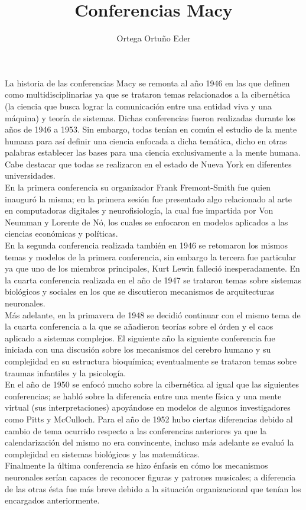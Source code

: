 \documentclass{article}
\title{Conferencias Macy}
\author{Ortega Ortu\~no Eder}
\date{} %
\begin{document}
	\maketitle
	\normalsize{
La historia de las conferencias Macy se remonta al año 1946 en las que definen como multidisciplinarias ya que se trataron temas relacionados a la cibernética (la ciencia que busca lograr la comunicación entre una entidad viva y una máquina) y teoría de sistemas. Dichas conferencias fueron realizadas durante los años de 1946 a 1953. Sin embargo, todas tenían en común el estudio de la mente humana para así definir una ciencia enfocada a dicha temática, dicho en otras palabras establecer las bases para una ciencia exclusivamente a la mente humana. Cabe destacar que todas se realizaron en el estado de Nueva York en diferentes universidades.
\\

En la primera conferencia su organizador Frank Fremont-Smith fue quien inauguró la misma; en la primera sesión fue presentado algo relacionado al arte en computadoras digitales y neurofisiología, la cual fue impartida por Von Neumman y Lorente de Nó, los cuales se enfocaron en modelos aplicados a las ciencias económicas y políticas.
\\

En la segunda conferencia realizada también en 1946 se retomaron los mismos temas y modelos de la primera conferencia, sin embargo la tercera fue particular ya que uno de los miembros principales, Kurt Lewin falleció inesperadamente. En la cuarta conferencia realizada en el año de 1947 se trataron temas sobre sistemas biológicos y sociales en los que se discutieron mecanismos de arquitecturas neuronales.
\\

Más adelante, en la primavera de 1948 se decidió continuar con el mismo tema de la cuarta conferencia a la que se añadieron teorías sobre el órden y el caos aplicado a sistemas complejos. El siguiente año la siguiente conferencia fue iniciada con una discusión sobre los mecanismos del cerebro humano y su complejidad en su estructura bioquímica; eventualmente se trataron temas sobre traumas infantiles y la psicología.
\\

En el año de 1950 se enfocó mucho sobre la cibernética al igual que las siguientes conferencias; se habló sobre la diferencia entre una mente física y una mente virtual (sus interpretaciones) apoyándose en modelos de algunos investigadores como Pitts y McCulloch. Para el año de 1952 hubo ciertas diferencias debido al cambio de tema ocurrido respecto a las conferencias anteriores ya que la calendarización del mismo no era convincente, incluso más adelante se evaluó la complejidad en sistemas biológicos y las matemáticas.
\\

Finalmente la última conferencia se hizo énfasis en cómo los mecanismos neuronales serían capaces de reconocer figuras y patrones musicales; a diferencia de las otras ésta fue más breve debido a la situación organizacional que tenían los encargados anteriormente.

}
\end{document}
